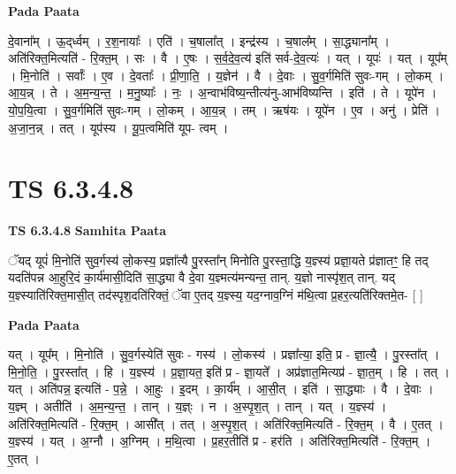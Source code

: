 \documentclass[17pt]{extarticle}
\begin{document}
\textbf{Pada Paata} \newline

दे॒वाना᳚म् । ऊ॒द्‌र्ध्वम् । र॒श॒नायाः᳚ । एति॑ । च॒षाला᳚त् । इन्द्र॑स्य । च॒षाल᳚म् । सा॒द्ध्याना᳚म् । अति॑रिक्त॒मित्यति॑ - रि॒क्त॒म् । सः । वै । ए॒षः । स॒र्व॒दे॒व॒त्य॑ इति॑ सर्व-दे॒व॒त्यः॑ । यत् । यूपः॑ । यत् । यूप᳚म् । मि॒नोति॑ । सर्वाः᳚ । ए॒व । दे॒वताः᳚ । प्री॒णा॒ति॒ । य॒ज्ञेन॑ । वै । दे॒वाः । सु॒व॒र्गमिति॑ सुवः-गम् । लो॒कम् । आ॒य॒न्न् । ते । अ॒म॒न्य॒न्त॒ । म॒नु॒ष्याः᳚ । नः॒ । अ॒न्वाभ॑विष्य॒न्तीत्य॑नु-आभ॑विष्यन्ति । इति॑ । ते । यूपे॑न । यो॒प॒यि॒त्वा । सु॒व॒र्गमिति॑ सुवः-गम् । लो॒कम् । आ॒य॒न्न् । तम् । ऋष॑यः । यूपे॑न । ए॒व । अनु॑ । प्रेति॑ । अ॒जा॒न॒न्न् । तत् । यूप॑स्य । यू॒प॒त्वमिति॑ यूप- त्वम् ।  \newline





\section{ TS 6.3.4.8 }

\textbf{TS 6.3.4.8 } \newline
\textbf{Samhita Paata} \newline

ॅयद् यूपं॑ मि॒नोति॑ सुव॒र्गस्य॑ लो॒कस्य॒ प्रज्ञा᳚त्यै पु॒रस्ता᳚न् मिनोति पु॒रस्ता॒द्धि य॒ज्ञ्स्य॑ प्रज्ञा॒यते प्र॑ज्ञातꣳ॒॒ हि तद् यदति॑पन्न आ॒हुरि॒दं का॒र्य॑मासी॒दिति॑ सा॒द्ध्या वै दे॒वा य॒ज्ञ्मत्य॑मन्यन्त॒ तान्. य॒ज्ञो नास्पृ॑श॒त् तान्. यद् य॒ज्ञ्स्याति॑रिक्त॒मासी॒त् तद॑स्पृश॒दति॑रिक्तं॒ ॅवा ए॒तद् य॒ज्ञ्स्य॒ यद॒ग्नाव॒ग्निं म॑थि॒त्वा प्र॒हर॒त्यति॑रिक्तमे॒त- [  ] \newline

\textbf{Pada Paata} \newline

यत् । यूप᳚म् । मि॒नोति॑ । सु॒व॒र्गस्येति॑ सुवः - गस्य॑ । लो॒कस्य॑ । प्रज्ञा᳚त्या॒ इति॒ प्र - ज्ञा॒त्यै॒ । पु॒रस्ता᳚त् । मि॒नो॒ति॒ । पु॒रस्ता᳚त् । हि । य॒ज्ञ्स्य॑ । प्र॒ज्ञा॒यत॒ इति॑ प्र - ज्ञा॒यते᳚ । अप्र॑ज्ञात॒मित्यप्र॑ - ज्ञा॒त॒म् । हि । तत् । यत् । अति॑पन्न॒ इत्यति॑ - प॒न्ने॒ । आ॒हुः । इ॒दम् । का॒र्य᳚म् । आ॒सी॒त् । इति॑ । सा॒द्ध्याः । वै । दे॒वाः । य॒ज्ञ्म् । अतीति॑ । अ॒म॒न्य॒न्त॒ । तान् । य॒ज्ञ्ः । न । अ॒स्पृ॒श॒त् । तान् । यत् । य॒ज्ञ्स्य॑ । अति॑रिक्त॒मित्यति॑ - रि॒क्त॒म् । आसी᳚त् । तत् । अ॒स्पृ॒श॒त् । अति॑रिक्त॒मित्यति॑ - रि॒क्त॒म् । वै । ए॒तत् । य॒ज्ञ्स्य॑ । यत् । अ॒ग्नौ । अ॒ग्निम् । म॒थि॒त्वा । प्र॒हर॒तीति॑ प्र - हर॑ति । अति॑रिक्त॒मित्यति॑ - रि॒क्त॒म् । ए॒तत् ।  \newline
\end{document}
